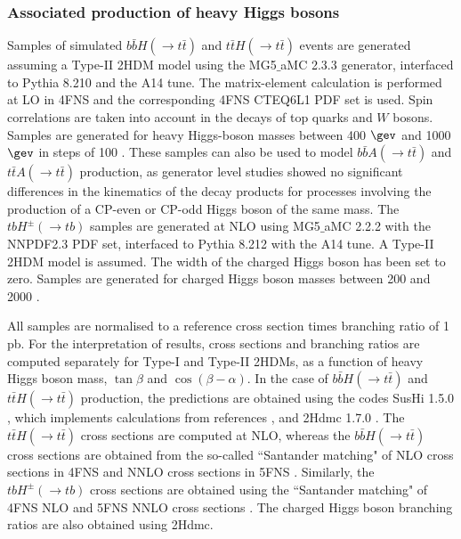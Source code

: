 \subsubsection{Associated production of heavy Higgs bosons}
Samples of simulated $b\bar{b}H(\to t\bar{t})$ and $t\bar{t}H(\to t\bar{t})$ events are generated assuming a Type-II 2HDM model using the {\sc MG5$\_$aMC} 2.3.3 generator, interfaced to {\sc Pythia} 8.210 and the A14 tune. The matrix-element calculation is performed at LO in 4FNS and the corresponding 4FNS CTEQ6L1 PDF set is used. Spin correlations are taken into account in the decays of top quarks and $W$ bosons. Samples are generated for heavy Higgs-boson masses between 400 $\gev$ and 1000 $\gev$ in steps of 100 \gev. These samples can also be used to model $b\bar{b}A(\to t\bar{t})$ and $t\bar{t}A(\to t\bar{t})$ production, as generator level studies showed no significant differences in the kinematics of the decay products for processes involving the production of a CP-even or CP-odd Higgs boson of the same mass. The $tbH^{\pm}(\to tb)$ samples are generated at NLO using {\sc MG5$\_$aMC} 2.2.2 with the NNPDF2.3 PDF set, interfaced to {\sc Pythia} 8.212 with the A14 tune. A Type-II 2HDM model is assumed. The width of the charged Higgs boson has been set to zero. Samples are generated for charged Higgs boson masses between 200 \gev and 2000 \gev.\par
All samples are normalised to a reference cross section times branching ratio of 1 pb. For the interpretation of results, cross sections and branching ratios are computed separately for Type-I and Type-II 2HDMs, as a function of heavy Higgs boson mass, $\tan \beta$ and $\cos(\beta - \alpha)$. In the case of $b\bar{b}H(\to t\bar{t})$ and $t\bar{t}H(\to t\bar{t})$ production, the predictions are obtained using the codes {\sc SusHi} 1.5.0 \cite{Harlander:2012pb}, which implements calculations from references \cite{Harlander:2002wh,Harlander:2003ai,Aglietti:2004nj,Bonciani:2010ms,Harlander:2005rq}, and {\sc 2Hdmc} 1.7.0 \cite{Eriksson:2009ws}. The $t\bar{t}H(\to t\bar{t})$ cross sections are computed at NLO, whereas the $b\bar{b}H(\to t\bar{t})$ cross sections are obtained from the so-called ``Santander matching" of NLO cross sections in 4FNS and NNLO cross sections in 5FNS \cite{Harlander:2011aa}. Similarly, the $tbH^{\pm}(\to tb)$ cross sections are obtained using the ``Santander matching" of 4FNS NLO and 5FNS NNLO cross sections \cite{Degrande:2015vpa,Flechl:2014wfa,Heinemeyer:2013tqa,Berger:2003sm}. The charged Higgs boson branching ratios are also obtained using {\sc 2Hdmc}.

